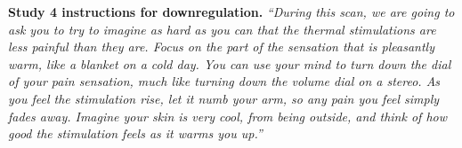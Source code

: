 \documentclass{article}
\begin{document}
\textbf{Study 4 instructions for downregulation.}
\textit{``During this scan, we are going to ask you to try to imagine as hard as you can that the thermal stimulations are less painful than they are. Focus on the part of the sensation that is pleasantly warm, like a blanket on a cold day. You can use your mind to turn down the dial of your pain sensation, much like turning down the volume dial on a stereo. As you feel the stimulation rise, let it numb your arm, so any pain you feel simply fades away. Imagine your skin is very cool, from being outside, and think of how good the stimulation feels as it warms you up.''}
\printglossaries





\end{document}

